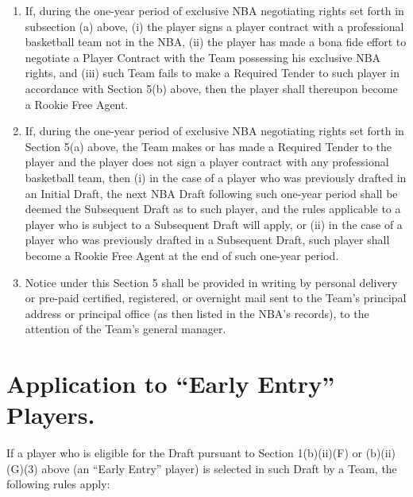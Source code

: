 \documentclass[
]{book}
\begin{document}
\begin{enumerate}
\item
  If, during the one-year period of exclusive NBA negotiating rights set forth in subsection (a) above, (i) the player signs a player contract with a professional basketball team not in the NBA, (ii) the player has made a bona fide effort to negotiate a Player Contract with the Team possessing his exclusive NBA rights, and (iii) such Team fails to make a Required Tender to such player in accordance with Section 5(b) above, then the player shall thereupon become a Rookie Free Agent.
\item
  If, during the one-year period of exclusive NBA negotiating rights set forth in Section 5(a) above, the Team makes or has made a Required Tender to the player and the player does not sign a player contract with any professional basketball team, then (i) in the case of a player who was previously drafted in an Initial Draft, the next NBA Draft following such one-year period shall be deemed the Subsequent Draft as to such player, and the rules applicable to a player who is subject to a Subsequent Draft will apply, or (ii) in the case of a player who was previously drafted in a Subsequent Draft, such player shall become a Rookie Free Agent at the end of such one-year period.
\item
  Notice under this Section 5 shall be provided in writing by personal delivery or pre-paid certified, registered, or overnight mail sent to the Team's principal address or principal office (as then listed in the NBA's records), to the attention of the Team's general manager.
\end{enumerate}

\hypertarget{application-to-early-entry-players.}{%
\section{Application to ``Early Entry'' Players.}\label{application-to-early-entry-players.}}

If a player who is eligible for the Draft pursuant to Section 1(b)(ii)(F) or (b)(ii)(G)(3) above (an ``Early Entry'' player) is selected in such Draft by a Team, the following rules apply:
\end{document}
